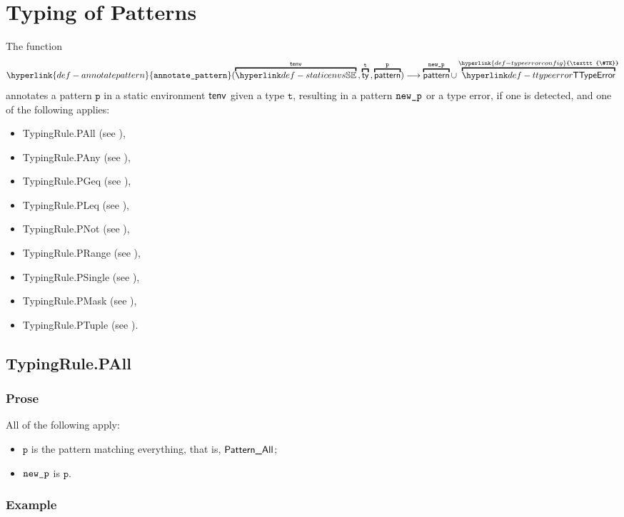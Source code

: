 \documentclass{book}
\newcommand\TypeErrorConfig[0]{\hyperlink{def-typeerrorconfig}{\texttt{\#TE}}}
\newcommand\annotatepattern[0]{\hyperlink{def-annotatepattern}{\texttt{annotate\_pattern}}}
\newcommand\vp[0]{\texttt{p}}
\newcommand\vt[0]{\texttt{t}}
\begin{document}
\chapter{Typing of Patterns}
\hypertarget{def-annotatepattern}{}
The function
\[
  \annotatepattern(
    \overname{\staticenvs}{\tenv} \aslsep
    \overname{\ty}{\vt} \aslsep
    \overname{\pattern}{\vp}) \aslto \overname{\pattern}{\newp} \cup \overname{\TTypeError}{\TypeErrorConfig}
\]
annotates a pattern $\vp$ in a static environment $\textsf{tenv}$ given a type $\vt$,
resulting in a pattern $\texttt{new\_p}$ or a type error, if one is detected, and one of the following applies:
\begin{itemize}
\item TypingRule.PAll (see ),
\item TypingRule.PAny (see ),
\item TypingRule.PGeq (see ),
\item TypingRule.PLeq (see ),
\item TypingRule.PNot (see ),
\item TypingRule.PRange (see ),
\item TypingRule.PSingle (see ),
\item TypingRule.PMask (see ),
\item TypingRule.PTuple (see ).
\end{itemize}

\section{TypingRule.PAll \label{sec:TypingRule.PAll}}

\subsection{Prose}
All of the following apply:
\begin{itemize}
  \item $\vp$ is the pattern matching everything, that is, $\textsf{Pattern\_All}$;
  \item $\texttt{new\_p}$ is $\vp$.
\end{itemize}

\subsection{Example}
\end{document}

